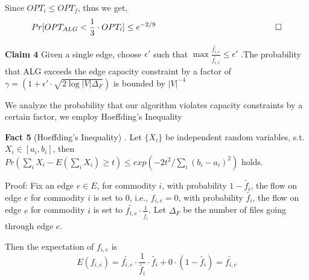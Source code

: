 \documentclass[onecolumn,11pt,journal, compsoc]{IEEEtran}
\newcommand*{\QEDB}{\hfill\ensuremath{\square}}%
\begin{document}
Since $OPT_i \le OPT_f$, thus we get, 
\begin{equation}
	Pr[OPT_{ALG}  < \frac{1}{3} \cdot OPT_i] \le e^{-2/9}
	\,\,\,\,\,\,\,\,\,\,\,\,\,\,\,\,\,\,\,\,\,\,\,\,\,\,\,\,\,\,\,\,\,\,\,\,\,\,\,\,\,\,\,\,\,\,\,\,\,\,\,\,\,\,\,\,\,\,\,\,\,\,\,\,\,\,\,\,\,\,\,\,\,\,\,\,\,\,\,\,\,\,\,\,\,\QEDB \nonumber
\end{equation}



%

\vspace*{0.15in}
\textbf{Claim 4} Given a single edge, choose $\epsilon'$ such that $\max \frac{\tilde{f_{i,e}}}{\tilde{f_{i,e}}} \le \epsilon'$ .The probability that ALG exceeds the edge capacity constraint by a factor of $\gamma = (1+\epsilon' \cdot \sqrt{2\log|V|\Delta_F})$ is bounded by $|V|^{-4}$
\vspace*{0.15in}

We analyze the probability that our algorithm violates capacity constraints by a certain factor, we employ Hoeffding's Inequality 

\textbf{Fact 5} (Hoeffding's Inequality)\cite{Devdatt} . Let $\{X_i\}$ be independent random variables, s.t. $X_i \in [a_i, b_i]$, then $Pr(\sum_{i}X_i - E(\sum_{i}X_i ) \ge t) \le exp(-2t^2 / \sum_{i}(b_i-a_i)^2 )$ holds.

Proof: Fix an edge $e \in E$, for commodity $i$, with probability $1-\tilde{f_i}$, the flow on edge $e$ for commodity $i$ is set to 0, i.e., $f_{i,e}=0$, with probability $\tilde{f_i}$, the flow on edge $e$ for commodity $i$ is set to $\tilde{f_{i,e}} \cdot \frac{1}{\tilde{f_i}}$. Let $\Delta_F$ be the number of files going through edge $e$. 

Then the expectation of $f_{i,e}$ is 
\begin{equation}
E(f_{i,e}) = \tilde{f_{i,e}} \cdot \frac{1}{\tilde{f_i}} \cdot  \tilde{f_i}+ 0 \cdot (1-\tilde{f_i}) = \tilde{f_{i,e}}
\end{equation}
\end{document}
